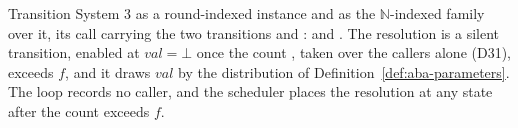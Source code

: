 \begin{definition}
  \label{def:aba-wcc-spec}
  \leanok
  Transition System 3 as a round-indexed instance and as the $\mathbb{N}$-indexed family over it, its call carrying the two transitions  and :  and .
  The resolution  is a silent transition, enabled at $val = \bot$ once the count , taken over the callers alone (D31), exceeds $f$, and it draws $val$ by the distribution of Definition~\ref{def:aba-parameters}.
  The loop  records no caller, and the scheduler places the resolution at any state after the count exceeds $f$.
\end{definition}
